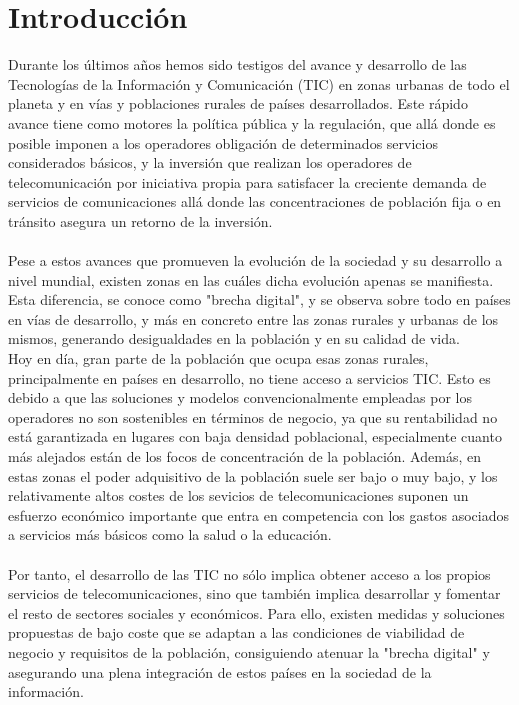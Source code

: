 \chapter{Introducción}
\label{cap:introduccion}
	Durante los últimos años hemos sido testigos del avance y desarrollo de las Tecnologías de la Información y Comunicación (TIC) en zonas urbanas de todo el planeta y en vías y poblaciones rurales  de países desarrollados. Este rápido avance tiene como motores la política pública y la regulación, que allá donde es posible imponen a los operadores obligación de determinados servicios considerados básicos, y la inversión que realizan los operadores de telecomunicación por iniciativa propia para satisfacer la creciente demanda de servicios de comunicaciones allá donde las concentraciones de población fija o en tránsito asegura un retorno de la inversión.\\\\
	
	Pese a estos avances que promueven la evolución de la sociedad y su desarrollo a nivel mundial, existen zonas en las cuáles dicha evolución apenas se manifiesta. Esta diferencia, se conoce como "brecha digital", y se observa sobre todo en países en vías de desarrollo, y más en concreto entre las zonas rurales y urbanas de los mismos, generando desigualdades en la población y en su calidad de vida.\\	  	
	Hoy en día, gran parte de la población que ocupa esas zonas rurales, principalmente en países en desarrollo, no tiene acceso a servicios TIC. Esto es debido a que las soluciones y modelos convencionalmente empleadas por los operadores no son sostenibles en términos de negocio, ya que su rentabilidad no está garantizada en lugares con baja densidad poblacional, especialmente cuanto más alejados están de los focos de concentración de la población. Además, en estas zonas el poder adquisitivo de la población suele ser bajo o muy bajo, y los relativamente altos costes de los sevicios de telecomunicaciones suponen un esfuerzo económico importante que entra en competencia con los gastos asociados a servicios más básicos como la salud o la educación.\\\\
	
	Por tanto, el desarrollo de las TIC no sólo implica obtener acceso a los propios servicios de telecomunicaciones, sino que también implica desarrollar y fomentar el resto de sectores sociales y económicos. Para ello, existen medidas y soluciones propuestas de bajo coste que se adaptan a las condiciones de viabilidad de negocio y requisitos de la población, consiguiendo atenuar la "brecha digital" y asegurando una plena integración de estos países en la sociedad de la información.
	

